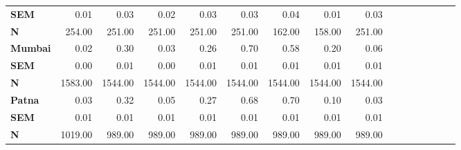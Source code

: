 \begin{tabular}{@{\extracolsep{5pt}}lrrrrrrrrrrrrrrr}
{\bf SEM} & 0.01\phantom{***} & 0.03\phantom{***} & 0.02\phantom{***} & 0.03\phantom{***} & 0.03\phantom{***} & 0.04\phantom{***} & 0.01\phantom{***} & 0.03\phantom{***} \\
{\bf N} & 254.00\phantom{***} & 251.00\phantom{***} & 251.00\phantom{***} & 251.00\phantom{***} & 251.00\phantom{***} & 162.00\phantom{***} & 158.00\phantom{***} & 251.00\phantom{***} \\
{\bf Mumbai} & 0.02\phantom{***} & 0.30\phantom{***} & 0.03\phantom{***} & 0.26\phantom{***} & 0.70\phantom{***} & 0.58\phantom{***} & 0.20\phantom{***} & 0.06\phantom{***} \\
{\bf SEM} & 0.00\phantom{***} & 0.01\phantom{***} & 0.00\phantom{***} & 0.01\phantom{***} & 0.01\phantom{***} & 0.01\phantom{***} & 0.01\phantom{***} & 0.01\phantom{***} \\
{\bf N} & 1583.00\phantom{***} & 1544.00\phantom{***} & 1544.00\phantom{***} & 1544.00\phantom{***} & 1544.00\phantom{***} & 1544.00\phantom{***} & 1544.00\phantom{***} & 1544.00\phantom{***} \\
{\bf Patna} & 0.03\phantom{***} & 0.32\phantom{***} & 0.05\phantom{***} & 0.27\phantom{***} & 0.68\phantom{***} & 0.70\phantom{***} & 0.10\phantom{***} & 0.03\phantom{***} \\
{\bf SEM} & 0.01\phantom{***} & 0.01\phantom{***} & 0.01\phantom{***} & 0.01\phantom{***} & 0.01\phantom{***} & 0.01\phantom{***} & 0.01\phantom{***} & 0.01\phantom{***} \\
{\bf N} & 1019.00\phantom{***} & 989.00\phantom{***} & 989.00\phantom{***} & 989.00\phantom{***} & 989.00\phantom{***} & 989.00\phantom{***} & 989.00\phantom{***} & 989.00\phantom{***} \\
\hline
\end{tabular}
